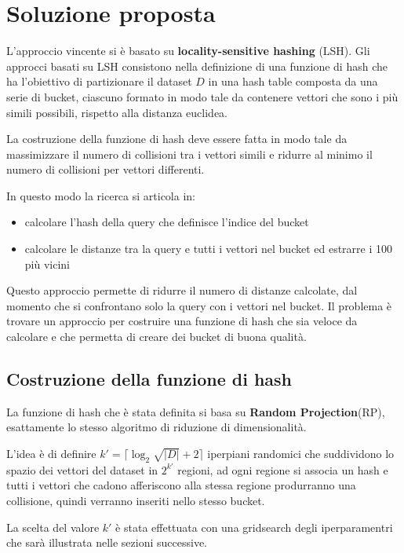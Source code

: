 \chapter{Soluzione proposta}
L'approccio vincente si è basato su \textbf{locality-sensitive hashing} (LSH).
Gli approcci basati su LSH consistono nella definizione di una funzione di hash 
che ha l'obiettivo di partizionare il dataset $D$ in una hash table composta 
da una serie di bucket, ciascuno 
formato in modo tale da contenere vettori che sono i più simili possibili, rispetto 
alla distanza euclidea. 

La costruzione della funzione di hash deve essere fatta in modo tale da 
massimizzare il numero di collisioni tra i vettori simili e ridurre al minimo 
il numero di collisioni per vettori differenti. 

In questo modo la ricerca si articola in:
\begin{itemize}
    \item calcolare l'hash della query che definisce l'indice del bucket
    \item calcolare le distanze tra la query e tutti i vettori nel bucket ed 
    estrarre i 100 più vicini
\end{itemize} 

Questo approccio permette di ridurre il numero di distanze calcolate, dal momento 
che si confrontano solo la query con i vettori nel bucket. Il problema è trovare 
un approccio per costruire una funzione di hash che sia veloce da calcolare e 
che permetta di creare dei bucket di buona qualità.

\section{Costruzione della funzione di hash}

La funzione di hash che è stata definita si basa su \textbf{Random Projection}(RP),
esattamente lo stesso algoritmo di riduzione di dimensionalità. 

L'idea è di definire $k' = \lceil \log_2{\sqrt{|D|}} + 2\rceil$ iperpiani randomici che suddividono
lo spazio dei vettori del dataset in $2^{k'}$ regioni, ad ogni regione si associa 
un hash e tutti i vettori che cadono afferiscono alla stessa regione produrranno 
una collisione, quindi verranno inseriti nello stesso bucket.

\begin{nota}
La scelta del valore $k'$ è stata effettuata con una gridsearch degli iperparamentri 
che sarà illustrata nelle sezioni successive.
\end{nota}


